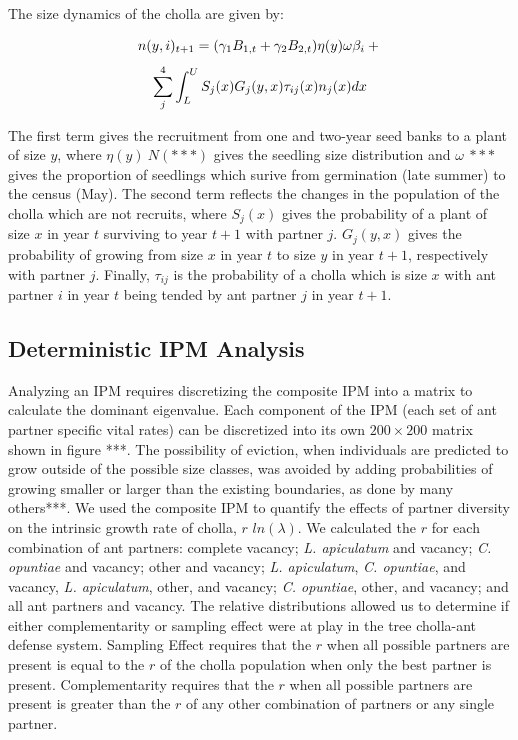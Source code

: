 \documentclass[11pt]{article}\usepackage[sc]{mathpazo} %
\begin{document}
  The size dynamics of the cholla are given by:
		
	\begin{linenomath*}
		$$
		n(y,i)_{t+1} = (\gamma_1 B_{1,t} + \gamma_2 B_{2,t}) \eta(y) \omega \beta_i  + \\
		$$
		$$
		\sum_{j}^{4} \int_L^U S_j(x) G_j(y,x) \tau_{ij}(x) n_j(x) dx \\
		$$
	\end{linenomath*}
	
  The first term gives the recruitment from one and two-year seed banks to a plant of size $y$, where $\eta(y) ~ N(***)$ gives the seedling size distribution and $\omega ~ ***$ gives the proportion of seedlings which surive from germination (late summer) to the census (May).
The second term reflects the changes in the population of the cholla which are not recruits, where $S_j(x)$ gives the probability of a plant of size $x$ in year $t$ surviving to year $t+1$ with partner $j$.
$G_j(y,x)$ gives the probability of growing from size $x$ in year $t$ to size $y$ in year $t+1$, respectively with partner $j$. 
Finally, $\tau_{ij}$ is the probability of a cholla which is size $x$ with ant partner $i$ in year $t$ being tended by ant partner $j$ in year $t+1$.

  \subsection*{Deterministic IPM Analysis}
  Analyzing an IPM requires discretizing the composite IPM into a matrix to calculate the dominant eigenvalue. 
Each component of the IPM (each set of ant partner specific vital rates) can be discretized into its own $ 200 \times 200$ matrix \as shown in figure ***. 
The possibility of eviction, when individuals are predicted to grow outside of the possible size classes, was avoided by adding probabilities of growing smaller or larger than the existing boundaries, as done by many others***.
We used the composite IPM to quantify the effects of partner diversity on the intrinsic growth rate of cholla, $r$ $ln(\lambda)$. 
We calculated the $r$ for each combination of ant partners: complete vacancy; \textit{L. apiculatum} and vacancy; \textit{C. opuntiae} and vacancy; other and vacancy; \textit{L. apiculatum}, \textit{C. opuntiae}, and vacancy, \textit{L. apiculatum}, other, and vacancy; \textit{C. opuntiae}, other, and vacancy; and all ant partners and vacancy.
The relative distributions allowed us to determine if either complementarity or sampling effect were at play in the tree cholla-ant defense system.
Sampling Effect requires that the $r$ when all possible partners are present is equal to the $r$ of the cholla population when only the best partner is present.
Complementarity requires that the $r$ when all possible partners are present is greater than the $r$ of any other combination of partners or any single partner. 
\end{document}
